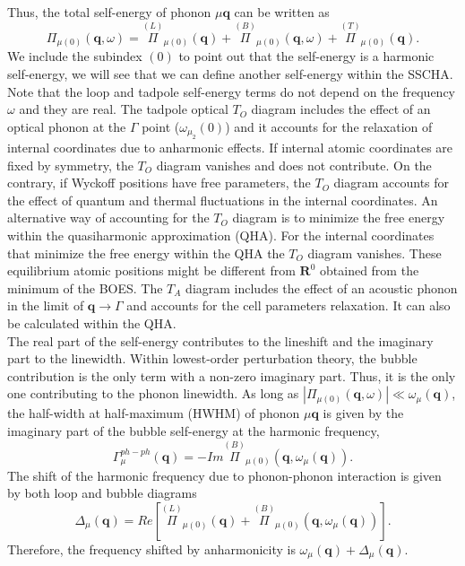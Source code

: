 Thus, the total self-energy of phonon $\mu\mathbf{q}$ can be written as
\begin{equation}
 \label{total-self-energy}
 \Pi_{\mu(0)}(\mathbf{q},\omega) = \overset{(L)}{\Pi}_{\mu(0)}(\mathbf{q}) + \overset{(B)}{\Pi}_{\mu(0)}(\mathbf{q},\omega) + \overset{(T)}{\Pi}_{\mu(0)}(\mathbf{q}).
\end{equation}
We include the subindex $(0)$ to point out that the self-energy is a harmonic self-energy, we will see that we can define another self-energy within the SSCHA. 
Note that the loop and tadpole self-energy terms do not depend on the frequency $\omega$ and they are real. 
The tadpole optical $T_{O}$ diagram includes the effect of an optical phonon at the $\Gamma$ point ($\omega_{\mu_{2}}(0)$) and it accounts for the relaxation of internal coordinates due to anharmonic effects. If internal atomic 
coordinates are fixed by symmetry, the $T_{O}$ diagram vanishes and does not contribute\cite{calandra2007anharmonic}. On the contrary, if Wyckoff positions have free parameters\cite{aroyo2011crystallography}, the $T_{O}$ diagram 
accounts for the effect of quantum and thermal fluctuations in the internal coordinates. An alternative way of accounting for the $T_{O}$ diagram is to minimize the free energy within the quasiharmonic approximation 
(QHA)\cite{bonini2007phonon}. For the internal coordinates that minimize the free energy within the QHA the $T_{O}$ diagram vanishes. These equilibrium atomic positions might be different from $\mathbf{R}^{0}$ obtained from the 
minimum of the BOES. The $T_{A}$ diagram includes the effect of an acoustic phonon in the limit of $\mathbf{q}\rightarrow\Gamma$ and accounts for the cell parameters relaxation. It can also be calculated within the 
QHA\cite{bonini2007phonon}. \\

The real part of the self-energy contributes to the lineshift and the imaginary part to the linewidth. Within lowest-order perturbation theory, the bubble contribution is the only term with a non-zero imaginary part. Thus, it 
is the only one contributing to the phonon linewidth. As long as $|\Pi_{\mu(0)}(\mathbf{q},\omega)|\ll\omega_{\mu}(\mathbf{q})$, the half-width at half-maximum (HWHM) of phonon $\mu\mathbf{q}$ is given by the imaginary part of the 
bubble self-energy at the harmonic frequency,
\begin{equation}
 \label{linewidth}
 \Gamma_{\mu}^{ph-ph}(\mathbf{q})=-Im\overset{(B)}{\Pi}_{\mu(0)}(\mathbf{q},\omega_{\mu}(\mathbf{q})).
\end{equation}
The shift of the harmonic frequency due to phonon-phonon interaction is given by both loop and bubble diagrams
\begin{equation}
 \label{lineshift}
 \Delta_{\mu}(\mathbf{q})=Re[\overset{(L)}{\Pi}_{\mu(0)}(\mathbf{q})+\overset{(B)}{\Pi}_{\mu(0)}(\mathbf{q},\omega_{\mu}(\mathbf{q}))].
\end{equation}
Therefore, the frequency shifted by anharmonicity is $\omega_{\mu}(\mathbf{q})+\Delta_{\mu}(\mathbf{q})$. \\

